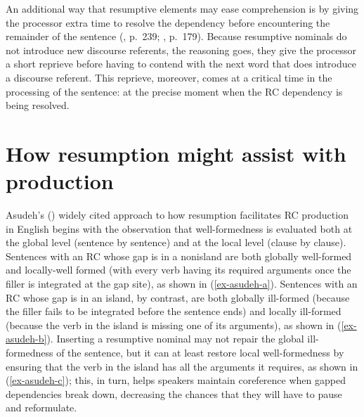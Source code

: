 An additional way that resumptive elements may ease comprehension is by giving the processor extra time to resolve the dependency before encountering the remainder of the sentence (\cite{hofmeister.norcliffe2013}, p.~239; \cite{meltzer-asscher2021}, p.~179). Because resumptive nominals do not introduce new discourse referents, the reasoning goes, they give the processor a short reprieve before having to contend with the next word that does introduce a discourse referent. This reprieve, moreover, comes at a critical time in the processing of the sentence: at the precise moment when the RC dependency is being resolved.

\section{How resumption might assist with production}\label{res-production}

Asudeh's (\citeyear{asudeh2004,asudeh2011,asudeh2012}) widely cited approach to how resumption facilitates RC production in English begins with the observation that well-formedness is evaluated both at the global level (sentence by sentence) and at the local level (clause by clause). Sentences with an RC whose gap is in a nonisland are both globally well-formed and locally-well formed (with every verb having its required arguments once the filler is integrated at the gap site), as shown in (\ref{ex-asudeh-a}). Sentences with an RC whose gap is in an island, by contrast, are both globally ill-formed (because the filler fails to be integrated before the sentence ends) and locally ill-formed (because the verb in the island is missing one of its arguments), as shown in (\ref{ex-asudeh-b}). Inserting a resumptive nominal may not repair the global ill-formedness of the sentence, but it can at least restore local well-formedness by ensuring that the verb in the island has all the arguments it requires, as shown in (\ref{ex-asudeh-c}); this, in turn, helps speakers maintain coreference when gapped dependencies break down, decreasing the chances that they will have to pause and reformulate.

